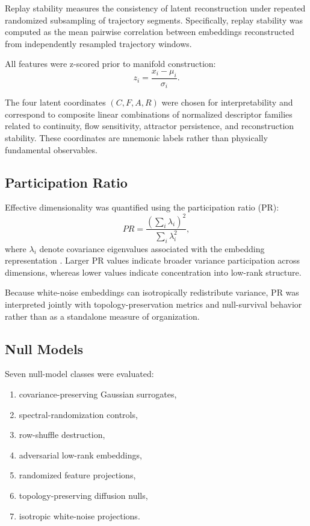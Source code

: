 \documentclass[%
 aip,
 chaos,
 amsmath,amssymb,
 reprint,
]{revtex4-2}
\begin{document}
Replay stability measures the consistency of latent reconstruction under repeated randomized subsampling of trajectory segments. Specifically, replay stability was computed as the mean pairwise correlation between embeddings reconstructed from independently resampled trajectory windows.

All features were z-scored prior to manifold construction:
\[
z_i = \frac{x_i - \mu_i}{\sigma_i}.
\]

The four latent coordinates $(C,F,A,R)$ were chosen for interpretability and correspond to composite linear combinations of normalized descriptor families related to continuity, flow sensitivity, attractor persistence, and reconstruction stability. These coordinates are mnemonic labels rather than physically fundamental observables.

\subsection{Participation Ratio}

Effective dimensionality was quantified using the participation ratio (PR):
\[
PR = \frac{\left(\sum_i \lambda_i\right)^2}{\sum_i \lambda_i^2},
\]
where $\lambda_i$ denote covariance eigenvalues associated with the embedding representation \cite{Verleysen2005}. Larger PR values indicate broader variance participation across dimensions, whereas lower values indicate concentration into low-rank structure.

Because white-noise embeddings can isotropically redistribute variance, PR was interpreted jointly with topology-preservation metrics and null-survival behavior rather than as a standalone measure of organization.

\subsection{Null Models}

Seven null-model classes were evaluated:
\begin{enumerate}
\item covariance-preserving Gaussian surrogates,
\item spectral-randomization controls,
\item row-shuffle destruction,
\item adversarial low-rank embeddings,
\item randomized feature projections,
\item topology-preserving diffusion nulls,
\item isotropic white-noise projections.
\end{enumerate}
\end{document}
